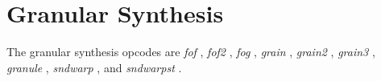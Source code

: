 \begin{comment}
\documentclass[10pt]{article}
\usepackage{fullpage, graphicx, url}
\setlength{\parskip}{1ex}
\setlength{\parindent}{0ex}
\title{Granular Synthesis}



\begin{tabular}{ccc}
The Alternative Csound Reference Manual & & \\
Previous &Signal Generators &Next

\end{tabular}

\end{comment}
\section{Granular Synthesis}


  The granular synthesis opcodes are \emph{fof}
, \emph{fof2}
, \emph{fog}
, \emph{grain}
, \emph{grain2}
, \emph{grain3}
, \emph{granule}
, \emph{sndwarp}
, and \emph{sndwarpst}
. 


\begin{comment}
\begin{tabular}{lcr}
Previous &Home &Next \\
FM Synthesis &Up &Linear and Exponential Generators

\end{tabular}



\end{comment}
